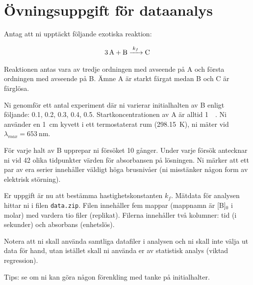 \section{Övningsuppgift för dataanalys}
\label{sec:exercise}
Antag att ni upptäckt följande exotiska reaktion:

\begin{align}
  \label{eq:fourth-order}
  \ce{3A + B ->[k_f] C}
\end{align}

Reaktionen antas vara av tredje ordningen med avseende på A och första
ordningen med avseende på B. Ämne A är starkt färgat medan B och C är
färglösa.

Ni genomför ett antal experiment där ni varierar initialhalten av B enligt
följande: \SI{0.1}{\Molar}, \SI{0.2}{\Molar}, \SI{0.3}{\Molar}, \SI{0.4}{\Molar},
\SI{0.5}{\Molar}. Startkoncentrationen av A är alltid
\SI{1}{\milli\Molar}. Ni använder en \SI{1}{\cm} kyvett i ett
termostaterat rum (\SI{298.15}{\kelvin}), ni mäter vid
$\lambda_{max}=\SI{653}{\nano\metre}$.

För varje halt av B upprepar ni försöket 10 gånger. Under varje försök
antecknar ni vid 42 olika tidpunkter värden för absorbansen på lösningen.
Ni märker att ett par av era serier innehåller väldigt höga brusnivåer
(ni misstänker någon form av elektrisk störning).

Er uppgift är nu att bestämma hastighetskonstanten $k_f$. Mätdata för
analysen hittar ni i filen {\tt data.zip}. Filen innehåller fem mappar
(mappnamn är [B]$_0$ i molar) med vardera tio filer (replikat). Filerna
innehåller två kolumner: tid (i sekunder) och absorbans (enhetslös).

Notera att ni skall använda samtliga datafiler i analysen och ni skall
inte välja ut data för hand, utan istället skall ni använda er av
statistisk analys (viktad regression).

Tips: se om ni kan göra någon förenkling med tanke på initialhalter.

